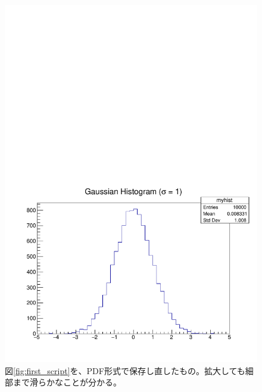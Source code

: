 \begin{figure}
  \centering
  \includegraphics[width=12cm,clip]{fig/first_script_pdf.pdf}
  \caption{図\ref{fig:first_script}を、PDF形式で保存し直したもの。拡大しても細部まで滑らかなことが分かる。}
  \label{fig:first_script_pdf}
\end{figure}

